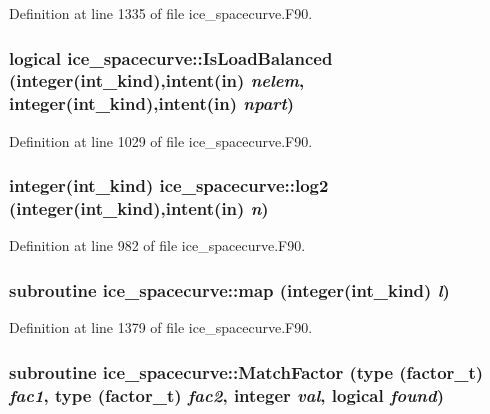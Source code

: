 Definition at line 1335 of file ice\_\-spacecurve.F90.\hypertarget{namespaceice__spacecurve_a2f6ae79d60cad9d3e019550e76cb5706}{
\subsubsection[{IsLoadBalanced}]{\setlength{\rightskip}{0pt plus 5cm}logical ice\_\-spacecurve::IsLoadBalanced (integer(int\_\-kind),intent(in) {\em nelem}, \/  integer(int\_\-kind),intent(in) {\em npart})}}
\label{namespaceice__spacecurve_a2f6ae79d60cad9d3e019550e76cb5706}


Definition at line 1029 of file ice\_\-spacecurve.F90.\hypertarget{namespaceice__spacecurve_a2010d172fdabf272358d0f809c046175}{
\subsubsection[{log2}]{\setlength{\rightskip}{0pt plus 5cm}integer(int\_\-kind) ice\_\-spacecurve::log2 (integer(int\_\-kind),intent(in) {\em n})}}
\label{namespaceice__spacecurve_a2010d172fdabf272358d0f809c046175}


Definition at line 982 of file ice\_\-spacecurve.F90.\hypertarget{namespaceice__spacecurve_a841d5cc5194de1c7aef94576c0eb5405}{
\subsubsection[{map}]{\setlength{\rightskip}{0pt plus 5cm}subroutine ice\_\-spacecurve::map (integer(int\_\-kind) {\em l})}}
\label{namespaceice__spacecurve_a841d5cc5194de1c7aef94576c0eb5405}


Definition at line 1379 of file ice\_\-spacecurve.F90.\hypertarget{namespaceice__spacecurve_a873b84a1b720159b0a0d4dd6a4f1df1c}{
\subsubsection[{MatchFactor}]{\setlength{\rightskip}{0pt plus 5cm}subroutine ice\_\-spacecurve::MatchFactor (type (factor\_\-t) {\em fac1}, \/  type (factor\_\-t) {\em fac2}, \/  integer {\em val}, \/  logical {\em found})}}
\label{namespaceice__spacecurve_a873b84a1b720159b0a0d4dd6a4f1df1c}


